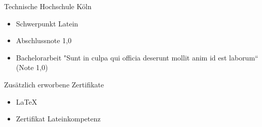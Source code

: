 \begin{smashminipageright}
	Technische Hochschule Köln
	\begin{itemize}
		\itemsep0em %
		\item Schwerpunkt Latein
		\item Abschlussnote 1,0
		\item Bachelorarbeit "Sunt in culpa qui officia deserunt mollit anim id est laborum“ (Note 1,0)
	\end{itemize}	
	Zusätzlich erworbene Zertifikate
	\begin{itemize}
		\itemsep0em %
		\item \LaTeX
		\item Zertifikat Lateinkompetenz
	\end{itemize}
	\smallbreak
\end{smashminipageright}
